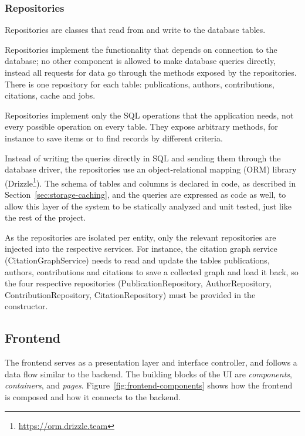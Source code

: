 \subsubsection{Repositories}

Repositories are classes that read from and write to the database tables.

Repositories implement the functionality that depends on connection to the database; no other component is allowed to make database queries directly, instead all requests for data go through the methods exposed by the repositories.
There is one repository for each table: \textsf{publications}, \textsf{authors}, \textsf{contributions}, \textsf{citations}, \textsf{cache} and \textsf{jobs}.

Repositories implement only the SQL operations that the application needs, not every possible operation on every table.
They expose arbitrary methods, for instance to save items or to find records by different criteria.

Instead of writing the queries directly in SQL and sending them through the database driver, the repositories use an object-relational mapping (ORM) library (\textsf{Drizzle}\footnote{\url{https://orm.drizzle.team}}).
The schema of tables and columns is declared in code, as described in Section~\ref{sec:storage-caching}, and the queries are expressed as code as well, to allow this layer of the system to be statically analyzed and unit tested, just like the rest of the project.

As the repositories are isolated per entity, only the relevant repositories are injected into the respective services.
For instance, the citation graph service (\textsf{CitationGraphService}) needs to read and update the tables \textsf{publications}, \textsf{authors}, \textsf{contributions} and \textsf{citations} to save a collected graph and load it back, so the four respective repositories (\textsf{PublicationRepository}, \textsf{AuthorRepository}, \textsf{ContributionRepository}, \textsf{CitationRepository}) must be provided in the constructor.

\subsection{Frontend} \label{sec:frontend-layers}

The frontend serves as a presentation layer and interface controller, and follows a data flow similar to the backend.
The building blocks of the UI are \emph{components}, \emph{containers}, and \emph{pages}.
Figure~\ref{fig:frontend-components} shows how the frontend is composed and how it connects to the backend. 

